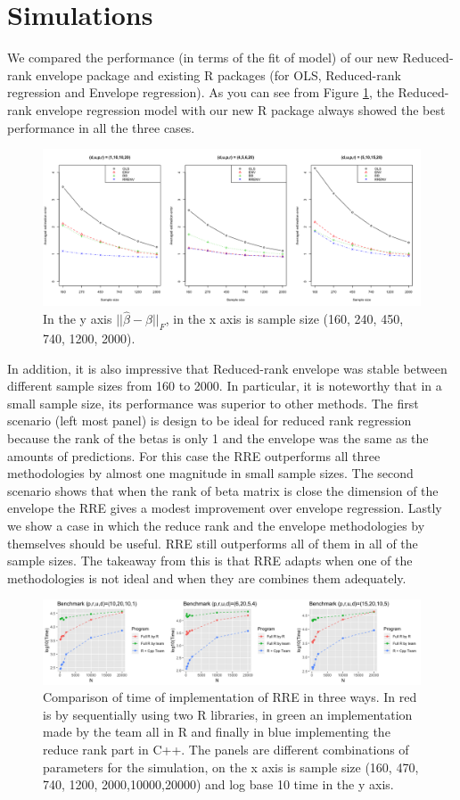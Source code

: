 \documentclass[11pt,a4paper]{article}
\begin{document}
\section{Simulations}
We compared the performance (in terms of the fit of model) of our new Reduced-rank envelope package and existing R packages (for OLS, Reduced-rank regression and Envelope regression). 
As you can see from Figure \ref{fig:accu}, the Reduced-rank envelope regression model with our new R package always showed the best performance in all the three cases.
\begin{figure}
\centering
\label{fig:accu}
\includegraphics[scale=.4]{accuracy.png}
\caption{In the y axis $||\hat{\beta}-\beta||_F$, in the x axis is sample size (160, 240, 450, 740, 1200, 2000). }
\end{figure}
In addition, it is also impressive that Reduced-rank envelope was stable between different sample sizes from 160 to 2000. 
In particular, it is noteworthy that in a small sample size, its performance was superior to other methods. 
The first scenario (left most panel) is design to be ideal for reduced rank regression because the rank of the betas is only 1 and the envelope was the same as the amounts of predictions. 
For this case the RRE outperforms all three methodologies by almost one magnitude in small sample sizes. 
The second scenario shows that when the rank of beta matrix is close the dimension of the envelope the RRE gives a modest improvement over envelope regression. 
Lastly we show a case in which the reduce rank and the envelope methodologies by themselves should be useful. 
RRE still outperforms all of them in all of the sample sizes. 
The takeaway from this is that RRE adapts when one of the methodologies is not ideal and when they are combines them adequately. 
\begin{figure}
\centering
\label{fig:bench}
\includegraphics[scale=.42]{Benchmark.png}
\caption{Comparison of time of implementation of RRE in three ways. In red is by sequentially using two R libraries, in green an implementation made by the team all in R and finally in blue implementing the reduce rank part in C++. The panels are different combinations of parameters for the simulation, on the x axis is sample size (160, 470, 740, 1200, 2000,10000,20000) and log base 10 time in the y axis.}
\end{figure}
\newpage
\end{document}
